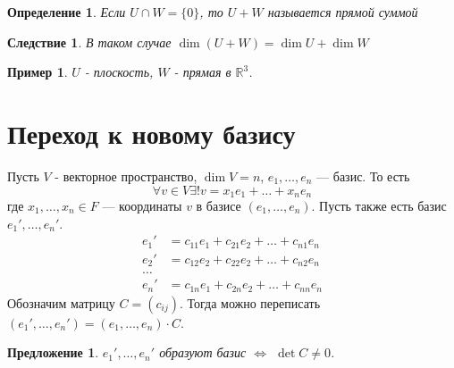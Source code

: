 \documentclass[a4paper,12pt]{article}
\newtheorem*{Def}{Определение}
\newtheorem*{Suggestion}{Предложение}
\newtheorem*{Examples}{Пример}
\newtheorem*{Consequence}{Следствие}
\begin{document}
\begin{Def}
Если $U \cap W = \{0\}$, то $U + W$ называется прямой суммой
\end{Def}
\begin{Consequence}
В таком случае $\dim\left(U+W\right) = \dim U + \dim W$
\end{Consequence}
\begin{Examples}
    $U$ - плоскость, $W$ - прямая в $\mathbb{R}^3$.
\end{Examples}

\section*{Переход к новому базису}
Пусть $V$ - векторное пространство, $\dim V = n$, $e_1, \ldots, e_n$ --- базис. То есть
\[
\forall v \in V \exists ! v = x_1e_1 + \ldots + x_ne_n
\]
где $x_1, \ldots, x_n \in F$ --- координаты $v$ в базисе $\left(e_1, \ldots, e_n\right)$. 
Пусть также есть базис $e_1', \ldots, e_n'$. 
\begin{align*}
    e_1' &= c_{11}e_1 + c_{21}e_2 + \ldots + c_{n1}e_n\\
    e_2' &= c_{12}e_2 + c_{22}e_2 + \ldots + c_{n2}e_n\\
    \ldots\\
    e_n' &= c_{1n}e_1 + c_{2n}e_2 + \ldots + c_{nn}e_n
\end{align*}
Обозначим матрицу $C = \left(c_{ij}\right)$. Тогда можно переписать $\left(e_1', \ldots, e_n'\right) = \left(e_1, \ldots, e_n\right)\cdot C$.
\begin{Suggestion}
$e_1', \ldots, e_n'$ образуют базис $\Leftrightarrow$ $\det C \neq 0$.
\end{Suggestion}
\end{document}
